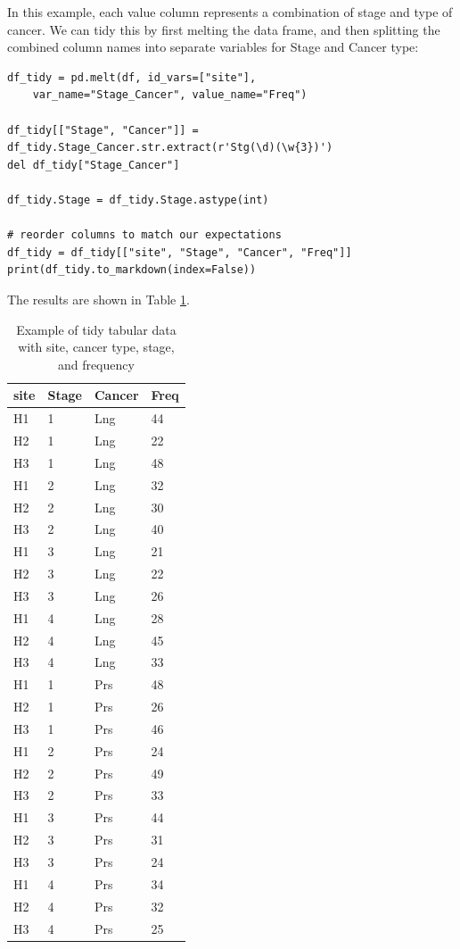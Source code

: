 \bigskip

In this example, each value column represents a combination of stage and type of cancer.  We can tidy this by first melting the data frame, and then splitting the combined column names into separate variables for Stage and Cancer type:

\begin{lstlisting}[style=Python]
df_tidy = pd.melt(df, id_vars=["site"], 
    var_name="Stage_Cancer", value_name="Freq")

df_tidy[["Stage", "Cancer"]] = df_tidy.Stage_Cancer.str.extract(r'Stg(\d)(\w{3})')
del df_tidy["Stage_Cancer"]

df_tidy.Stage = df_tidy.Stage.astype(int)

# reorder columns to match our expectations
df_tidy = df_tidy[["site", "Stage", "Cancer", "Freq"]]
print(df_tidy.to_markdown(index=False))
\end{lstlisting}

The results are shown in Table \ref{tidy-multiple-variables-table}.

\bigskip\noindent
\begin{table}[!htbp]
\centering
\begin{tabular}{p{}p{}p{}p{}}
\toprule
site & Stage & Cancer & Freq \\
\hline
H1 & 1 & Lng & 44 \\
H2 & 1 & Lng & 22 \\
H3 & 1 & Lng & 48 \\
H1 & 2 & Lng & 32 \\
H2 & 2 & Lng & 30 \\
H3 & 2 & Lng & 40 \\
H1 & 3 & Lng & 21 \\
H2 & 3 & Lng & 22 \\
H3 & 3 & Lng & 26 \\
H1 & 4 & Lng & 28 \\
H2 & 4 & Lng & 45 \\
H3 & 4 & Lng & 33 \\
H1 & 1 & Prs & 48 \\
H2 & 1 & Prs & 26 \\
H3 & 1 & Prs & 46 \\
H1 & 2 & Prs & 24 \\
H2 & 2 & Prs & 49 \\
H3 & 2 & Prs & 33 \\
H1 & 3 & Prs & 44 \\
H2 & 3 & Prs & 31 \\
H3 & 3 & Prs & 24 \\
H1 & 4 & Prs & 34 \\
H2 & 4 & Prs & 32 \\
H3 & 4 & Prs & 25 \\
\bottomrule
\end{tabular}
\caption{Example of tidy tabular data with site, cancer type, stage, and frequency}
\label{tidy-multiple-variables-table}
\end{table}


